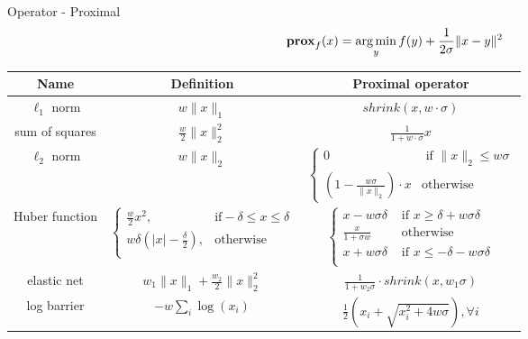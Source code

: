 \documentclass[hyperref,handout,compress,9pt,mathserif]{beamer}
\begin{document}
\begin{frame}{Operator - Proximal}
$${\mathbf{prox}}_f (x) = \operatorname*{arg\,min}_{y} f(y) + \frac{1}{2\sigma} \|x - y\|^2$$
\begin{small}

\begin{table}[htbp]
\centering
 \begin{tabular}{|c|c|c|}
  \hline
  Name & Definition & Proximal operator \\
  \hline
  \hline
  $\ell_1$ norm & $w \|x\|_1$ & $shrink(x, w \cdot \sigma)$ \\
  \hline  
  sum of squares & $\frac{w}{2} \|x\|_2^2$ & $\frac{1}{1 + w \cdot \sigma} x$ \\
  \hline 
  $\ell_2$ norm & $w \|x\|_2$ & $\begin{cases} 
  							0 & \text{ if } \|x\|_2 \leq w \sigma \\
							(1 - \frac{w \sigma}{\|x\|_2}) \cdot x & \text{otherwise}
							\end{cases}$ \\							
  \hline
  Huber function & $ \begin{cases}
  				\frac{w}{2} x^2, &\text{if} -\delta \leq x \leq \delta \\
				 w \delta(|x| - \frac{\delta}{2}), &\text{otherwise} \\
  			       \end{cases}$ & $\begin{cases} x -  w \sigma  \delta & \text{ if } x \geq \delta +  w \sigma \delta\\
			       \frac{x}{1 + \sigma w} & \text{ otherwise } \\
			        x +  w \sigma \delta  & \text{ if } x \leq -\delta -  w \sigma \delta\\
			       \end{cases}$ \\
  \hline		
 elastic net & $w_1 \|x\|_1 + \frac{w_2}{2} \|x\|_2^2$ &  $\frac{1}{1 + w_2 \sigma} \cdot shrink(x, w_1 \sigma)$\\
 \hline
 log barrier & $- w \sum_{i} \log(x_i)$ & $\frac{1}{2} (x_i + \sqrt{x_i^2 + 4 w \sigma}), \forall i$ \\
 \hline
 \end{tabular}
\end{table}
\end{small}
\end{frame}
\end{document}
